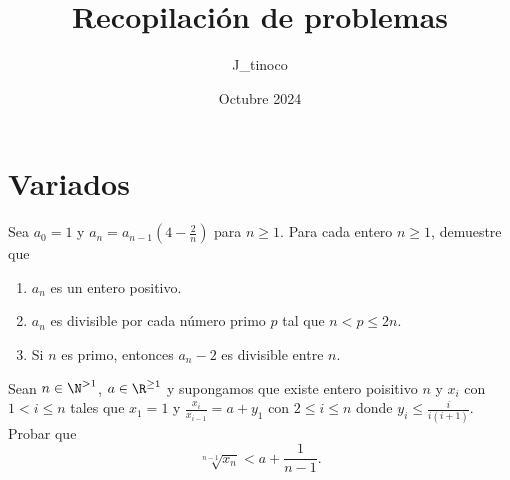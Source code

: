 \documentclass[12pt]{article}
\title{Recopilación de problemas}
\author{J\_tinoco}
\date{Octubre 2024}
\begin{document}
    \maketitle

    \section{Variados}

    \begin{problem}
        Sea $a_0 = 1$ y $a_n = a_{n - 1}\left(4 - \frac{2}{n}\right)$ para $n \geq 1$.
        Para cada entero $n \geq 1$, demuestre que
        \begin{enumerate}
            \item $a_n$ es un entero positivo.
            \item $a_n$ es divisible por cada número primo $p$ tal que $n < p \leq 2n$.
            \item Si $n$ es primo, entonces $a_n - 2$ es divisible entre $n$.
        \end{enumerate}
    \end{problem}

    \begin{problem}
        Sean $n \in \N^{> 1}$, $a \in \R^{\geq 1}$ y supongamos que existe entero poisitivo $n$ y $x_i$ con $1 < i \leq n$ tales que
        $x_1 = 1$ y $\frac{x_i}{x_{i - 1}} = a + y_1$ con $2 \leq i \leq n$ donde $y_i \leq \frac{i}{i(i + 1)}$.
        Probar que
        \[
            \sqrt[n - 1]{x_n} < a + \frac{1}{n - 1}.
        \]
    \end{problem}
\end{document}
